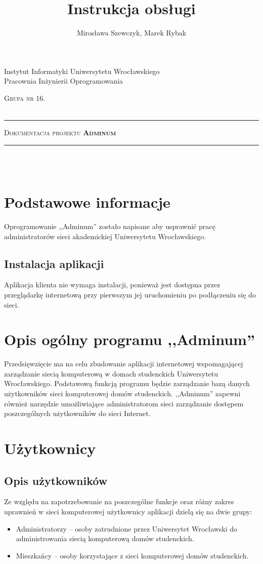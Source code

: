 \documentclass[12pt,a4paper,notitlepage]{article}
\author{Mirosława Szewczyk, Marek Rybak}
\title{Instrukcja obsługi}
\makeatletter
\newcommand{\linia}{\rule{\linewidth}{0.4mm}}
\renewcommand{\maketitle}{\begin{titlepage}
    \vspace*{2cm}
    \begin{center}\small        
        Instytut Informatyki Uniwersytetu Wrocławskiego\\
        Pracownia Inżynierii Oprogramowania\\
  \vspace{2cm}
       
      \normalsize \textsc{ Grupa nr 16.}\\
        \normalsize \textsc{\@author}\\
\end{center}
    \vspace{3cm}
    \noindent\linia
    \begin{center}
        \LARGE \textsc{Dokumentacja projektu \textbf{Adminum}}\\       
        \linia
        \vspace{2cm}
        \LARGE \textsc{\@title}\\
      
        \vspace{1.5cm}
       \normalsize \@date\\




    \end{center}
  \end{titlepage}
}
\makeatother
\begin{document}
    \maketitle
\setcounter{page}{2}
    \tableofcontents
    \newpage
    \section{Podstawowe informacje}
	Oprogramowanie ,,Adminum'' zostało napisane aby usprawnić pracę administratorów sieci akademickiej Uniwersytetu Wrocławskiego.
   \subsection{Instalacja aplikacji}
	Aplikacja klienta nie wymaga instalacji, ponieważ jest dostępna przez przeglądarkę internetową przy pierwszym jej uruchomieniu po podłączeniu się do sieci.
  \section{Opis ogólny programu ,,Adminum''}
	Przedsięwzięcie ma na celu zbudowanie aplikacji internetowej wspomagającej zarządzanie siecią komputerową w domach studenckich Uniwersytetu Wrocławskiego. Podstawową funkcją programu będzie zarządzanie bazą danych użytkowników sieci komputerowej domów studenckich. ,,Adminum'' zapewni również narzędzie umożliwiające administratorom sieci zarządzanie dostępem poszczególnych użytkowników do sieci Internet.
    \section{Użytkownicy}
	\subsection{Opis użytkowników}
	Ze względu na zapotrzebowanie na poszczególne funkcje oraz różny zakres uprawnień w sieci komputerowej użytkownicy aplikacji dzielą się na dwie grupy:
	\begin{itemize}
		\item Administratorzy -- osoby zatrudnione przez Uniwersytet Wrocławski do administrowania siecią komputerową domów studenckich.
		\item Mieszkańcy -- osoby korzystające z sieci komputerowej domów studenckich. 
	\end{itemize}
	
	
\end{document}
